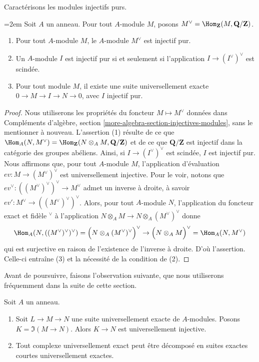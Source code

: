 \noindent
Caractérisons les modules injectifs purs.

\begin{lemma}
\label{lemma-pure-injective}
{\emergencystretch=2em
Soit $A$ un anneau. Pour tout $A$-module $M$, posons
$M^\vee = \Hom_\mathbf{Z}(M, \mathbf{Q}/\mathbf{Z})$.
\par}
\begin{enumerate}
\item Pour tout $A$-module $M$, le $A$-module $M^\vee$ est injectif pur.
\item Un $A$-module $I$ est injectif pur si et seulement si l'application
$I \to (I^\vee)^\vee$ est scindée.
\item Pour tout module $M$, il existe une suite universellement exacte
$0 \to M \to I \to N \to 0$, avec $I$ injectif pur.
\end{enumerate}
\end{lemma}

\begin{proof}
Nous utiliserons les propriétés du foncteur $M \mapsto M^\vee$ données dans
Compléments d'algèbre, section \ref{more-algebra-section-injectives-modules},
sans le mentionner à nouveau. L'assertion (1) résulte de ce que
$\Hom_A(N, M^\vee) =
\Hom_\mathbf{Z}(N \otimes_A M, \mathbf{Q}/\mathbf{Z})$
et de ce que $\mathbf{Q}/\mathbf{Z}$ est injectif dans la catégorie des
groupes abéliens. Ainsi, si $I \to (I^\vee)^\vee$ est scindée,
$I$ est injectif pur. Nous affirmons que, pour tout $A$-module $M$,
l'application d'évaluation $ev : M \to (M^\vee)^\vee$ est universellement injective.
Pour le voir, notons que $ev^\vee : ((M^\vee)^\vee)^\vee \to M^\vee$
admet un inverse à droite, à savoir $ev' : M^\vee \to ((M^\vee)^\vee)^\vee$.
Alors, pour tout $A$-module $N$, l'application du foncteur exact et fidèle
${}^\vee$ à l'application $N \otimes_A M \to N \otimes_A (M^\vee)^\vee$
donne
$$
\Hom_A(N, ((M^\vee)^\vee)^\vee) =
\Big(N \otimes_A (M^\vee)^\vee\Big)^\vee
\to
\Big(N \otimes_A M\Big)^\vee =
\Hom_A(N, M^\vee)
$$
qui est surjective en raison de l'existence de l'inverse à droite. D'où l'assertion.
Celle-ci entraîne (3) et la nécessité de la condition de (2).
\end{proof}

\noindent
Avant de poursuivre, faisons l'observation suivante, que nous utiliserons
fréquemment dans la suite de cette section.

\begin{lemma}
\label{lemma-split-universally-exact-sequence}
Soit $A$ un anneau.
\begin{enumerate}
\item Soit $L \to M \to N$ une suite universellement exacte
de $A$-modules. Posons $K = \Im(M \to N)$.
Alors $K \to N$ est universellement injective.
\item Tout complexe universellement exact
peut être décomposé en suites exactes courtes universellement exactes.
\end{enumerate}
\end{lemma}

